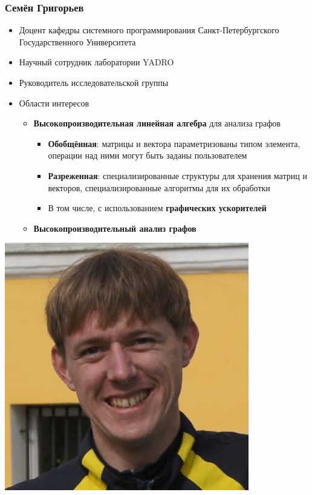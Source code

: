\documentclass[xcolor=table,aspectratio=169]{beamer}
\begin{document}
\begin{frame}[fragile]
  \frametitle{Семён Григорьев}
  \begin{minipage}{0.70\textwidth}
  \begin{itemize}    
    \item Доцент кафедры системного программирования Санкт-Петербургского Государственного Университета
    \item Научный сотрудник лаборатории YADRO
    \item Руководитель исследовательской группы
    \item Области интересов
    \begin{itemize}
      \item \textbf{Высокопроизводительная линейная алгебра} для анализа графов
      \begin{itemize}
        \item \textbf{Обобщённая}: матрицы и вектора параметризованы типом элемента, операции над ними могут быть заданы пользователем
        \item \textbf{Разреженная}: специализированные структуры для хранения матриц и векторов, специализированные алгоритмы для их обработки 
        \item В том числе, с использованием \textbf{графических ускорителей}
      \end{itemize}
      \item \textbf{Высокопроизводительный анализ графов}      
    \end{itemize}
    \end{itemize}
\end{minipage}
\begin{minipage}[t]{0.29\textwidth}
  \begin{center}
\includegraphics[width=0.8\textwidth]{pictures/SemyonGrigorev.jpg}

\end{center}
\end{minipage}
\end{frame}
\end{document}
